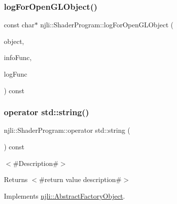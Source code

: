 \subsubsection{\texorpdfstring{log\+For\+Open\+G\+L\+Object()}{logForOpenGLObject()}}
{\footnotesize\ttfamily const char$\ast$ njli\+::\+Shader\+Program\+::log\+For\+Open\+G\+L\+Object (\begin{DoxyParamCaption}\item[{\mbox{\hyperlink{_util_8h_a10e94b422ef0c20dcdec20d31a1f5049}{u32}}}]{object,  }\item[{\mbox{\hyperlink{_shader_program_8h_a50070b167d585b9e4ba6faa4e3063cc7}{G\+L\+Info\+Function}}}]{info\+Func,  }\item[{\mbox{\hyperlink{_shader_program_8h_a946b6792efe50de240df436a3d028764}{G\+L\+Log\+Function}}}]{log\+Func }\end{DoxyParamCaption}) const}

\mbox{\label{classnjli_1_1_shader_program_a2af9c6b24ed749e698c3fce3fabda18f}} 
\subsubsection{\texorpdfstring{operator std\+::string()}{operator std::string()}}
{\footnotesize\ttfamily njli\+::\+Shader\+Program\+::operator std\+::string (\begin{DoxyParamCaption}{ }\end{DoxyParamCaption}) const\hspace{0.3cm}{\ttfamily [virtual]}}

$<$\#\+Description\#$>$

\begin{DoxyReturn}{Returns}
$<$\#return value description\#$>$ 
\end{DoxyReturn}


Implements \mbox{\hyperlink{classnjli_1_1_abstract_factory_object_a838f4fa7e65cace6098aab5222892942}{njli\+::\+Abstract\+Factory\+Object}}.

\mbox{\label{classnjli_1_1_shader_program_aba28741515ef99ccd725473aadd26a93}} 
